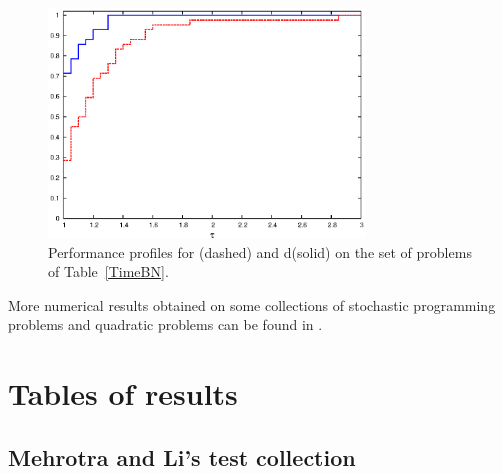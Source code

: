 \begin{figure}[ht]
  \centering
  \includegraphics[width=0.75\textwidth]{figures/perfprof-BN.eps}
  \caption{Performance profiles for \HO (dashed) and d\HO (solid)
           on the set of problems of Table~\ref{TimeBN}.}
  \label{fig:PerfProfile}
\end{figure}

More numerical results obtained on some collections of stochastic
programming problems and quadratic problems can be found in
\cite{ColomboGondzio05}.

\newpage

%
%
\section{Tables of results}

\setlength{\tabcolsep}{4.6pt}

%
%
\subsection*{Mehrotra and Li's test collection}

